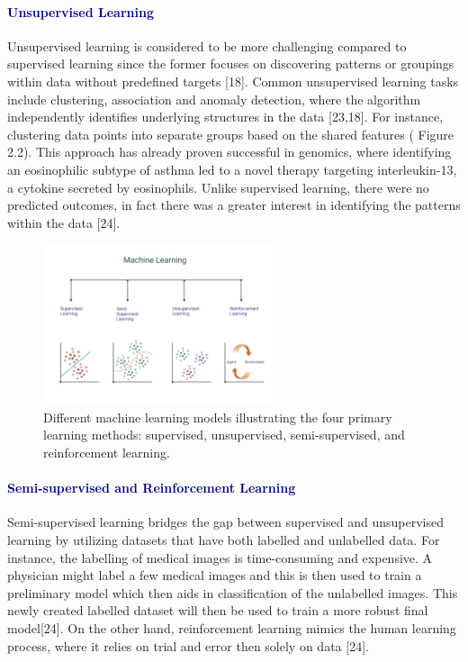 \documentclass[12pt,a4paper]{report}
\begin{document}
\paragraph{\textcolor{darkblue}{Unsupervised Learning}} 
Unsupervised learning is considered to be more challenging compared to supervised learning since the former focuses on discovering patterns or groupings within data without predefined targets [18]. Common unsupervised learning tasks include clustering, association and anomaly detection, where the algorithm independently identifies underlying structures in the data [23,18].
For instance, clustering data points into separate groups based on the shared features ( Figure 2.2). This approach has already proven successful in genomics, where identifying an eosinophilic subtype of asthma led to a novel therapy targeting interleukin-13, a cytokine secreted by eosinophils. Unlike supervised learning, there were no predicted outcomes, in fact there was a greater interest in identifying the patterns within the data [24]. \\

\begin{figure}[h]
    \centering
    \includegraphics[width=0.6\textwidth]{images/ml.png} 
    \caption{Different machine learning models illustrating the four primary learning methods: supervised, unsupervised, semi-supervised, and reinforcement learning.}
    \label{Figure 1}
\end{figure}

\paragraph{\textcolor{darkblue}{Semi-supervised and Reinforcement Learning}}
Semi-supervised learning bridges the gap between supervised and unsupervised learning by utilizing datasets that have both labelled and unlabelled data. For instance, 
the labelling of medical images is time-consuming and expensive. A physician might label a few medical images and this is then used to train a preliminary model which 
then aids in classification of the unlabelled images. This newly created labelled dataset will then be used to train a more robust final model[24]. On the other hand, reinforcement learning mimics the human learning process, where it relies on trial and error then solely on data [24]. \\
\end{document}
